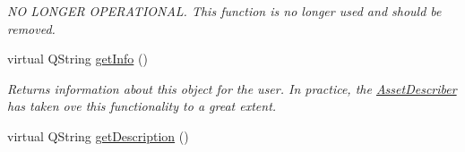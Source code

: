 \begin{DoxyCompactItemize}
\begin{DoxyCompactList}\small\item\em N\-O L\-O\-N\-G\-E\-R O\-P\-E\-R\-A\-T\-I\-O\-N\-A\-L. This function is no longer used and should be removed. \end{DoxyCompactList}\item 
virtual Q\-String \hyperlink{class_picto_1_1_asset_a7dbcf2a6375ba18aa3a489f3fea2d71a}{get\-Info} ()
\begin{DoxyCompactList}\small\item\em Returns information about this object for the user. In practice, the \hyperlink{class_asset_describer}{Asset\-Describer} has taken ove this functionality to a great extent. \end{DoxyCompactList}\item 
\hypertarget{class_picto_1_1_asset_a809157b144c05d01b3a2bd839e9298a0}{virtual Q\-String \hyperlink{class_picto_1_1_asset_a809157b144c05d01b3a2bd839e9298a0}{get\-Description} ()}\label{class_picto_1_1_asset_a809157b144c05d01b3a2bd839e9298a0}


\end{DoxyCompactItemize}
